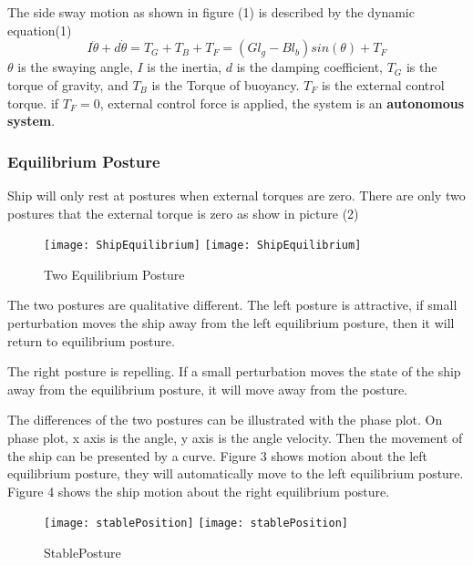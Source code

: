 The side sway motion as shown in figure (1) is described by the dynamic equation(1)
\begin{equation}
I \ddot{\theta}+d\dot{\theta}=T_{G}+T_{B}+T_{F}=(Gl_{g}-Bl_{b})sin(\theta)+T_{F}
\end{equation}
$\theta$ is the swaying angle,
$I$ is the inertia,  
$d$ is the damping coefficient,
$T_{G}$ is the torque of gravity, and $T_{B}$ is the Torque of buoyancy.
$T_{F}$ is the external control torque.
if $T_{F}=0$, external control force is applied, the system is an \textbf{autonomous system}.




\subsubsection*{Equilibrium Posture}
Ship will only rest at postures when external torques are zero.
There are only two postures that the external torque is zero as show in picture (2)
\begin{figure}[!htbp]
  \begin{center}
    \leavevmode
    \ifpdf
      \texttt{[image: ShipEquilibrium]}
    \else
      \texttt{[image: ShipEquilibrium]}
    \fi
    \caption{Two Equilibrium Posture}
    \label{fig:ShipEqulibrium}
  \end{center}
\end{figure}



The two postures are qualitative different.
The left posture is attractive, if small perturbation moves the ship away from the left equilibrium posture, then it will return to equilibrium posture.

The right posture is repelling.
If a small perturbation moves the state of the ship away from the equilibrium posture, it will move away from the posture.

The differences of the two postures can be illustrated with the phase plot.
On phase plot, x axis is the angle, y axis is the angle velocity. 
Then the movement of the ship can be presented by a curve.
Figure 3 shows motion about the left equilibrium posture, they will automatically move to the left equilibrium posture.
Figure 4 shows the ship motion about the right equilibrium posture.
 
\begin{figure}[!htbp]
  \begin{center}
    \leavevmode
    \ifpdf
      \texttt{[image: stablePosition]}
    \else
      \texttt{[image: stablePosition]}
    \fi
    \caption{StablePosture}
    \label{fig:StablePosture}
  \end{center}
\end{figure}


